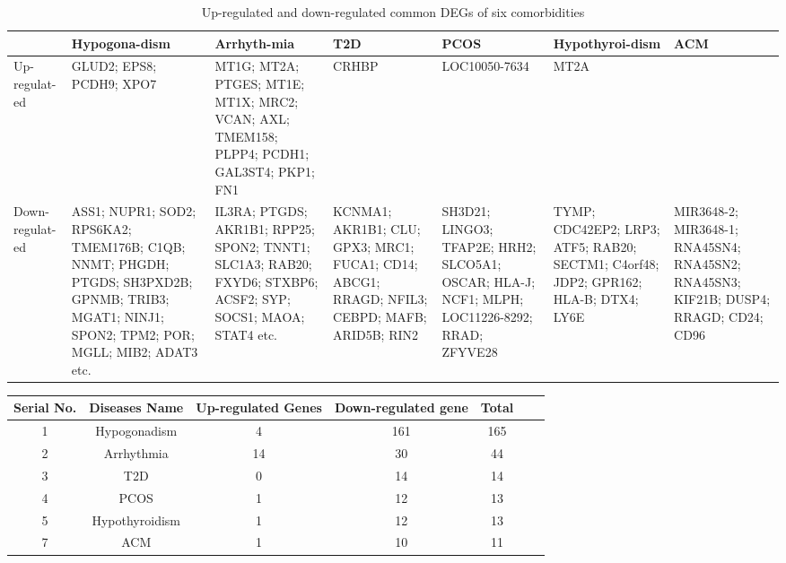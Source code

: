 \begin{longtable}{|p{1.2cm}|p{2cm}|p{1.8cm}|p{1.8cm}|p{2cm}|p{2cm}|p{1.7cm}|}
    \caption[Up-regulated and down-regulated common DEGs of six comorbidities]{Up-regulated and down-regulated common DEGs of six comorbidities} \\
    \hline
    & Hypogona-dism & Arrhyth-mia & T2D & PCOS & Hypothyroi-dism & ACM \\
    \hline
    Up-regulat-ed & GLUD2;  EPS8;  PCDH9; XPO7 & MT1G; MT2A; PTGES; MT1E; MT1X; MRC2; VCAN; AXL; TMEM158; PLPP4; PCDH1; GAL3ST4; PKP1; FN1 & CRHBP & LOC10050-7634 & MT2A & \\
    \hline
    \hline
    Down-regulat-ed & ASS1; NUPR1; SOD2; RPS6KA2; TMEM176B; C1QB; NNMT; PHGDH; PTGDS; SH3PXD2B; GPNMB; TRIB3; MGAT1; NINJ1; SPON2; TPM2; POR; MGLL; MIB2; ADAT3 etc. & IL3RA; PTGDS; AKR1B1; RPP25; SPON2; TNNT1; SLC1A3; RAB20; FXYD6; STXBP6; ACSF2; SYP; SOCS1; MAOA; STAT4 etc. & KCNMA1; AKR1B1; CLU; GPX3; MRC1; FUCA1; CD14; ABCG1; RRAGD; NFIL3; CEBPD; MAFB; ARID5B; RIN2 & SH3D21; LINGO3; TFAP2E; HRH2; SLCO5A1; OSCAR; HLA-J; NCF1; MLPH; LOC11226-8292; RRAD; ZFYVE28 & TYMP; CDC42EP2; LRP3; ATF5; RAB20; SECTM1; C4orf48; JDP2; GPR162; HLA-B; DTX4; LY6E & MIR3648-2; MIR3648-1; RNA45SN4; RNA45SN2; RNA45SN3; KIF21B; DUSP4; RRAGD; CD24; CD96 \\
    \hline
\end{longtable}

\begin{table}[H]
    \centering
    \begin{tabular}{ccccccc}
        \toprule
        Serial No. & Diseases Name & Up-regulated Genes & Down-regulated gene & Total \\
        \midrule
        1 & Hypogonadism & 4 & 161 & 165 \\
        2 & Arrhythmia & 14 & 30 & 44 \\
        3 & T2D & 0 & 14 & 14 \\
        4 & PCOS & 1 & 12 & 13 \\
        5 & Hypothyroidism & 1 & 12 & 13 \\
        7 & ACM & 1 & 10 & 11 \\
        \bottomrule
    \end{tabular}
    
    \label{tab:common_degs_bt}
\end{table}

